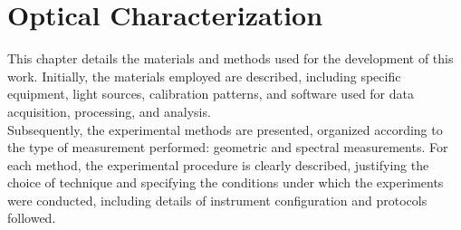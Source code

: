 \chapter{Optical Characterization}

\noindent This chapter details the materials and methods used for the development of this work. Initially, the materials employed are described, including specific equipment, light sources, calibration patterns, and software used for data acquisition, processing, and analysis.\\

\noindent Subsequently, the experimental methods are presented, organized according to the type of measurement performed: geometric and spectral measurements. For each method, the experimental procedure is clearly described, justifying the choice of technique and specifying the conditions under which the experiments were conducted, including details of instrument configuration and protocols followed.\\







